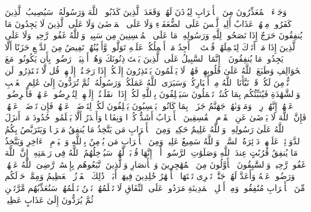 \stopbuffer
\startbuffer[\q:9:90]
وَجَاۤءَ ٱلۡمُعَذِّرُونَ مِنَ ٱلۡأَعۡرَابِ لِیُؤۡذَنَ لَهُمۡ وَقَعَدَ ٱلَّذِینَ كَذَبُوا۟ ٱللَّهَ وَرَسُولَهُۥۚ سَیُصِیبُ ٱلَّذِینَ كَفَرُوا۟ مِنۡهُمۡ عَذَابٌ أَلِیمࣱ%
\stopbuffer
\startbuffer[\q:9:91]
لَّیۡسَ عَلَى ٱلضُّعَفَاۤءِ وَلَا عَلَى ٱلۡمَرۡضَىٰ وَلَا عَلَى ٱلَّذِینَ لَا یَجِدُونَ مَا یُنفِقُونَ حَرَجٌ إِذَا نَصَحُوا۟ لِلَّهِ وَرَسُولِهِۦۚ مَا عَلَى ٱلۡمُحۡسِنِینَ مِن سَبِیلࣲۚ وَٱللَّهُ غَفُورࣱ رَّحِیمࣱ%
\stopbuffer
\startbuffer[\q:9:92]
وَلَا عَلَى ٱلَّذِینَ إِذَا مَاۤ أَتَوۡكَ لِتَحۡمِلَهُمۡ قُلۡتَ لَاۤ أَجِدُ مَاۤ أَحۡمِلُكُمۡ عَلَیۡهِ تَوَلَّوا۟ وَّأَعۡیُنُهُمۡ تَفِیضُ مِنَ ٱلدَّمۡعِ حَزَنًا أَلَّا یَجِدُوا۟ مَا یُنفِقُونَ%
\stopbuffer
\startbuffer[\q:9:93]
۞ إِنَّمَا ٱلسَّبِیلُ عَلَى ٱلَّذِینَ یَسۡتَءۡذِنُونَكَ وَهُمۡ أَغۡنِیَاۤءُۚ رَضُوا۟ بِأَن یَكُونُوا۟ مَعَ ٱلۡخَوَالِفِ وَطَبَعَ ٱللَّهُ عَلَىٰ قُلُوبِهِمۡ فَهُمۡ لَا یَعۡلَمُونَ%
\stopbuffer
\startbuffer[\q:9:94]
یَعۡتَذِرُونَ إِلَیۡكُمۡ إِذَا رَجَعۡتُمۡ إِلَیۡهِمۡۚ قُل لَّا تَعۡتَذِرُوا۟ لَن نُّؤۡمِنَ لَكُمۡ قَدۡ نَبَّأَنَا ٱللَّهُ مِنۡ أَخۡبَارِكُمۡۚ وَسَیَرَى ٱللَّهُ عَمَلَكُمۡ وَرَسُولُهُۥ ثُمَّ تُرَدُّونَ إِلَىٰ عَٰلِمِ ٱلۡغَیۡبِ وَٱلشَّهَٰدَةِ فَیُنَبِّئُكُم بِمَا كُنتُمۡ تَعۡمَلُونَ%
\stopbuffer
\startbuffer[\q:9:95]
سَیَحۡلِفُونَ بِٱللَّهِ لَكُمۡ إِذَا ٱنقَلَبۡتُمۡ إِلَیۡهِمۡ لِتُعۡرِضُوا۟ عَنۡهُمۡۖ فَأَعۡرِضُوا۟ عَنۡهُمۡۖ إِنَّهُمۡ رِجۡسࣱۖ وَمَأۡوَىٰهُمۡ جَهَنَّمُ جَزَاۤءَۢ بِمَا كَانُوا۟ یَكۡسِبُونَ%
\stopbuffer
\startbuffer[\q:9:96]
یَحۡلِفُونَ لَكُمۡ لِتَرۡضَوۡا۟ عَنۡهُمۡۖ فَإِن تَرۡضَوۡا۟ عَنۡهُمۡ فَإِنَّ ٱللَّهَ لَا یَرۡضَىٰ عَنِ ٱلۡقَوۡمِ ٱلۡفَٰسِقِینَ%
\stopbuffer
\startbuffer[\q:9:97]
ٱلۡأَعۡرَابُ أَشَدُّ كُفۡرࣰا وَنِفَاقࣰا وَأَجۡدَرُ أَلَّا یَعۡلَمُوا۟ حُدُودَ مَاۤ أَنزَلَ ٱللَّهُ عَلَىٰ رَسُولِهِۦۗ وَٱللَّهُ عَلِیمٌ حَكِیمࣱ%
\stopbuffer
\startbuffer[\q:9:98]
وَمِنَ ٱلۡأَعۡرَابِ مَن یَتَّخِذُ مَا یُنفِقُ مَغۡرَمࣰا وَیَتَرَبَّصُ بِكُمُ ٱلدَّوَاۤئِرَۚ عَلَیۡهِمۡ دَاۤئِرَةُ ٱلسَّوۡءِۗ وَٱللَّهُ سَمِیعٌ عَلِیمࣱ%
\stopbuffer
\startbuffer[\q:9:99]
وَمِنَ ٱلۡأَعۡرَابِ مَن یُؤۡمِنُ بِٱللَّهِ وَٱلۡیَوۡمِ ٱلۡءَاخِرِ وَیَتَّخِذُ مَا یُنفِقُ قُرُبَٰتٍ عِندَ ٱللَّهِ وَصَلَوَٰتِ ٱلرَّسُولِۚ أَلَاۤ إِنَّهَا قُرۡبَةࣱ لَّهُمۡۚ سَیُدۡخِلُهُمُ ٱللَّهُ فِی رَحۡمَتِهِۦۤۚ إِنَّ ٱللَّهَ غَفُورࣱ رَّحِیمࣱ%
\stopbuffer
\startbuffer[\q:9:100]
وَٱلسَّٰبِقُونَ ٱلۡأَوَّلُونَ مِنَ ٱلۡمُهَٰجِرِینَ وَٱلۡأَنصَارِ وَٱلَّذِینَ ٱتَّبَعُوهُم بِإِحۡسَٰنࣲ رَّضِیَ ٱللَّهُ عَنۡهُمۡ وَرَضُوا۟ عَنۡهُ وَأَعَدَّ لَهُمۡ جَنَّٰتࣲ تَجۡرِی تَحۡتَهَا ٱلۡأَنۡهَٰرُ خَٰلِدِینَ فِیهَاۤ أَبَدࣰاۚ ذَٰلِكَ ٱلۡفَوۡزُ ٱلۡعَظِیمُ%
\stopbuffer
\startbuffer[\q:9:101]
وَمِمَّنۡ حَوۡلَكُم مِّنَ ٱلۡأَعۡرَابِ مُنَٰفِقُونَۖ وَمِنۡ أَهۡلِ ٱلۡمَدِینَةِ مَرَدُوا۟ عَلَى ٱلنِّفَاقِ لَا تَعۡلَمُهُمۡۖ نَحۡنُ نَعۡلَمُهُمۡۚ سَنُعَذِّبُهُم مَّرَّتَیۡنِ ثُمَّ یُرَدُّونَ إِلَىٰ عَذَابٍ عَظِیمࣲ%
